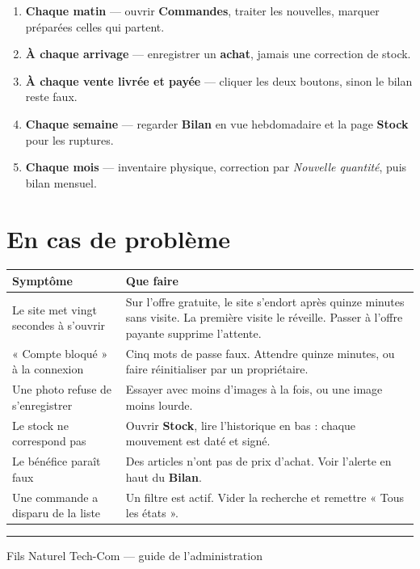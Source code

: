 \documentclass[11pt,a4paper]{article}
\newcommand{\menu}[1]{\textsf{\textbf{#1}}}
\begin{document}
\begin{enumerate}
  \item \textbf{Chaque matin} — ouvrir \menu{Commandes}, traiter les nouvelles, marquer préparées celles qui partent.
  \item \textbf{À chaque arrivage} — enregistrer un \textbf{achat}, jamais une correction de stock.
  \item \textbf{À chaque vente livrée et payée} — cliquer les deux boutons, sinon le bilan reste faux.
  \item \textbf{Chaque semaine} — regarder \menu{Bilan} en vue hebdomadaire et la page \menu{Stock} pour les ruptures.
  \item \textbf{Chaque mois} — inventaire physique, correction par \textit{Nouvelle quantité}, puis bilan mensuel.
\end{enumerate}

\section{En cas de problème}

\begin{center}
\begin{tabularx}{\textwidth}{@{}lX@{}}
\toprule
\textbf{Symptôme} & \textbf{Que faire} \\
\midrule
Le site met vingt secondes à s'ouvrir & Sur l'offre gratuite, le site s'endort après quinze minutes sans visite. La première visite le réveille. Passer à l'offre payante supprime l'attente. \\
« Compte bloqué » à la connexion & Cinq mots de passe faux. Attendre quinze minutes, ou faire réinitialiser par un propriétaire. \\
Une photo refuse de s'enregistrer & Essayer avec moins d'images à la fois, ou une image moins lourde. \\
Le stock ne correspond pas & Ouvrir \menu{Stock}, lire l'historique en bas : chaque mouvement est daté et signé. \\
Le bénéfice paraît faux & Des articles n'ont pas de prix d'achat. Voir l'alerte en haut du \menu{Bilan}. \\
Une commande a disparu de la liste & Un filtre est actif. Vider la recherche et remettre « Tous les états ». \\
\bottomrule
\end{tabularx}
\end{center}

\vspace{1.5cm}
\begin{center}
{\color{sig}\rule{3cm}{1.5pt}}\par
\vspace{0.4cm}
{\color{encre2}\small Fils Naturel Tech-Com — guide de l'administration}
\end{center}
\end{document}
